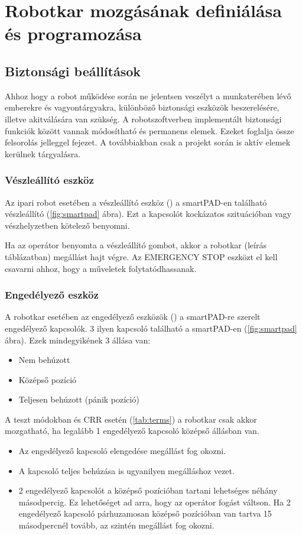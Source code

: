 \documentclass[../documentation.tex]{subfiles}
\begin{document}
\section{Robotkar mozgásának definiálása és programozása}
\subsection{Biztonsági beállítások}
Ahhoz hogy a robot működése során ne jelentsen veszélyt a munkaterében lévő emberekre és vagyontárgyakra, különböző biztonsági eszközök beszerelésére, illetve akitválására van szükség. A robotszoftverben implementált biztonsági funkciók között vannak módosítható és permanens elemek. Ezeket foglalja össze felsorolás jelleggel  fejezet. A továbbiakban csak a projekt során is aktív elemek kerülnek tárgyalásra.

\subsubsection{Vészleállító eszköz}
Az ipari robot esetében a vészleállító eszköz () a smartPAD-en található vészleállító (\ref{fig:smartpad} ábra). Ezt a kapcsolót kockázatos szituációban vagy vészhelyzetben kötelező benyomni.

Ha az operátor benyomta a vészleállító gombot, akkor a robotkar  (leírás  táblázatban) megállást hajt végre. Az EMERGENCY STOP eszközt el kell csavarni ahhoz, hogy a műveletek folytatódhassanak.

\subsubsection{Engedélyező eszköz}
A robotkar esetében az engedélyező eszközök () a smartPAD-re szerelt engedélyező kapcsolók. 3 ilyen kapcsoló található a smartPAD-en (\ref{fig:smartpad} ábra). Ezek mindegyikének 3 állása van:
\begin{itemize}
	\item Nem behúzott
	\item Középső pozíció
	\item Teljesen behúzott (pánik pozíció)
\end{itemize}

A teszt módokban és CRR esetén (\ref{tab:terms}) a robotkar csak akkor mozgatható, ha legalább 1 engedélyező kapcsoló középső állásban van.
\begin{itemize}
	\item Az engedélyező kapcsoló elengedése  megállást fog okozni.
	\item A kapcsoló teljes behúzása is ugyanilyen megálláshoz vezet.
	\item 2 engedélyező kapcsolót a középső pozícióban tartani lehetséges néhány másodpercig. Ez lehetőséget ad arra, hogy az operátor fogást váltson. Ha 2 engedélyező kapcsoló párhuzamosan középső pozícióban van tartva 15 másodpercnél tovább, az szintén  megállást fog okozni.
\end{itemize}
\end{document}
